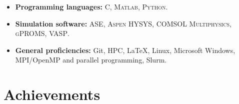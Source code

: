 \documentclass[11pt,a4paper,sans]{moderncv}   %
\def\CC{{\textsc{C\nolinebreak[4]\hspace{-.05em}\raisebox{.4ex}{\tiny\textbf{++}}}}}
\def\addls{\vspace{2pt}}
\begin{document}
	\addls
	
	\begin{itemize}
		
		\item \textbf{Programming languages:} \CC, \textsc{Matlab}, \textsc{Python}. 
		
		\addls
		
		\item \textbf{Simulation software:} \textsc{ASE}, \textsc{Aspen HYSYS}, \textsc{COMSOL Multiphysics}, \textsc{gPROMS}, \textsc{VASP}. 
		
		\addls
		
		\item \textbf{General proficiencies:} Git, HPC, \LaTeX, Linux, Microsoft Windows, MPI/OpenMP and parallel programming, Slurm.
		
	\end{itemize}
	
	\addls
	
	\section{Achievements}
	
	\addls
	
\end{document}
